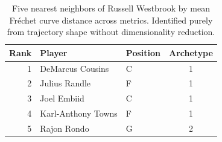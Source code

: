 \begin{table}[htbp]
  \centering\small
  \begin{tabular}{rllc}
    \toprule
    Rank & Player & Position & Archetype \\
    \midrule
    1 & DeMarcus Cousins & C & 1 \\
    2 & Julius Randle & F & 1 \\
    3 & Joel Embiid & C & 1 \\
    4 & Karl-Anthony Towns & F & 1 \\
    5 & Rajon Rondo & G & 2 \\
    \bottomrule
  \end{tabular}
  \caption{Five nearest neighbors of Russell Westbrook by mean Fr\'{e}chet curve distance across metrics. Identified purely from trajectory shape without dimensionality reduction.}
  \label{tab:Russell_Westbrook_frechet_curve_neighbors}
\end{table}

